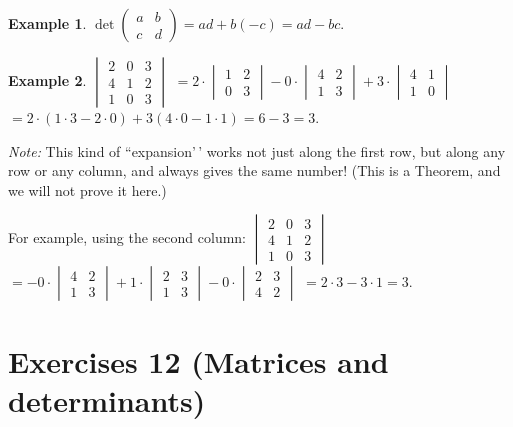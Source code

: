 \documentclass[
  12pt,
  oneside]{book}
\theoremstyle{definition}
\theoremstyle{definition}
\newtheorem{example}{Example}[chapter]
\theoremstyle{definition}
\theoremstyle{definition}
\theoremstyle{remark}
\begin{document}
\begin{example}
\protect\hypertarget{exm:unnamed-chunk-49}{}{\label{exm:unnamed-chunk-49} }\(\det\begin{pmatrix}a&b\\c&d\end{pmatrix} = ad + b(-c)=ad-bc\).
\end{example}

\begin{example}
\protect\hypertarget{exm:unnamed-chunk-50}{}{\label{exm:unnamed-chunk-50} }\(\begin{vmatrix}2&0&3\\4&1&2\\1&0&3\end{vmatrix}\)
\(=2\cdot\begin{vmatrix}1&2\\0&3\end{vmatrix} - 0\cdot\begin{vmatrix}4&2\\1&3\end{vmatrix} + 3\cdot\begin{vmatrix}4&1\\1&0\end{vmatrix}\)
\(=2\cdot(1\cdot3-2\cdot0) + 3(4\cdot0-1\cdot1)=6-3=3\).
\end{example}

\emph{Note:} This kind of ``expansion'\,' works not just along the first row, but along any row or any column, and always gives the same number! (This is a Theorem, and we will not prove it here.)

For example, using the second column:
\(\begin{vmatrix}2&0&3\\4&1&2\\1&0&3\end{vmatrix}\)
\(=-0\cdot\begin{vmatrix}4&2\\1&3\end{vmatrix} + 1\cdot\begin{vmatrix}2&3\\1&3\end{vmatrix} - 0\cdot\begin{vmatrix}2&3\\4&2\end{vmatrix}\)
\(=2\cdot3-3\cdot1=3\).

\hypertarget{exercises-12-matrices-and-determinants}{%
\chapter*{Exercises 12 (Matrices and determinants)}\label{exercises-12-matrices-and-determinants}}
\end{document}
